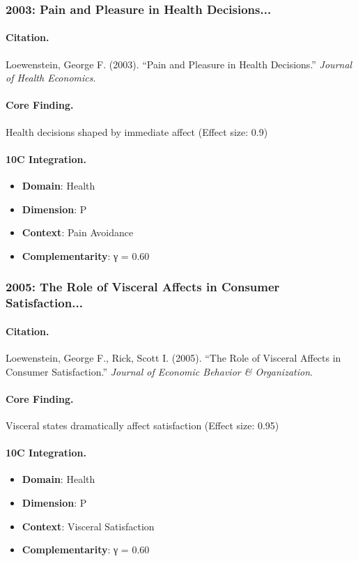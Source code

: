 \subsubsection{2003: Pain and Pleasure in Health Decisions...}

\paragraph{Citation.}
Loewenstein, George F. (2003). ``Pain and Pleasure in Health Decisions.''
\textit{Journal of Health Economics}.

\paragraph{Core Finding.}
Health decisions shaped by immediate affect (Effect size: 0.9)

\paragraph{10C Integration.}
\begin{itemize}[nosep]
  \item \textbf{Domain}: Health
  \item \textbf{Dimension}: P
  \item \textbf{Context}: Pain Avoidance
  \item \textbf{Complementarity}: γ = 0.60
\end{itemize}

\subsubsection{2005: The Role of Visceral Affects in Consumer Satisfaction...}

\paragraph{Citation.}
Loewenstein, George F., Rick, Scott I. (2005). ``The Role of Visceral Affects in Consumer Satisfaction.''
\textit{Journal of Economic Behavior & Organization}.

\paragraph{Core Finding.}
Visceral states dramatically affect satisfaction (Effect size: 0.95)

\paragraph{10C Integration.}
\begin{itemize}[nosep]
  \item \textbf{Domain}: Health
  \item \textbf{Dimension}: P
  \item \textbf{Context}: Visceral Satisfaction
  \item \textbf{Complementarity}: γ = 0.60
\end{itemize}

